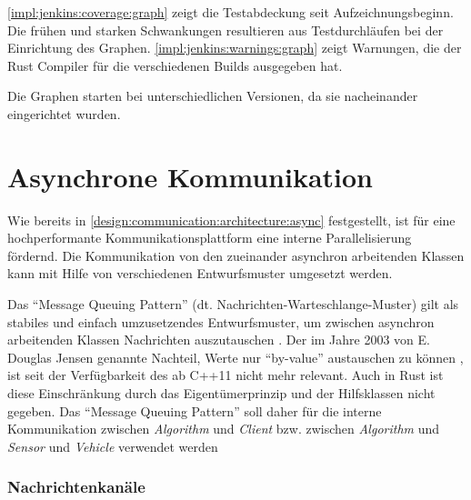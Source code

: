 \autoref{impl:jenkins:coverage:graph} zeigt die Testabdeckung seit Aufzeichnungsbeginn.
Die frühen und starken Schwankungen resultieren aus Testdurchläufen bei der Einrichtung des Graphen.
\autoref{impl:jenkins:warnings:graph} zeigt Warnungen, die der Rust Compiler für die verschiedenen Builds ausgegeben hat.

Die Graphen starten bei unterschiedlichen Versionen, da sie nacheinander eingerichtet wurden.

\clearpage
\section{Asynchrone Kommunikation}
\label{impl:channels}

Wie bereits in \autoref{design:communication:architecture:async} festgestellt, ist für eine hochperformante Kommunikationsplattform eine interne Parallelisierung fördernd.
Die Kommunikation von den zueinander asynchron arbeitenden Klassen kann mit Hilfe von verschiedenen Entwurfsmuster umgesetzt werden.

Das \enquote{Message Queuing Pattern} (dt. Nachrichten-Warteschlange-Muster) gilt als stabiles und einfach umzusetzendes Entwurfsmuster, um zwischen asynchron arbeitenden Klassen Nachrichten auszutauschen \cite[207]{douglass2003real}.
Der im Jahre 2003 von E. Douglas Jensen genannte Nachteil, Werte nur \enquote{by-value} austauschen zu können \cite[211]{douglass2003real}, ist seit der Verfügbarkeit des  ab C++11 nicht mehr relevant.
Auch in Rust ist diese Einschränkung durch das Eigentümerprinzip und der Hilfsklassen   nicht gegeben.
Das \enquote{Message Queuing Pattern} soll daher für die interne Kommunikation zwischen \textit{Algorithm} und \textit{Client} bzw. zwischen \textit{Algorithm} und \textit{Sensor} und \textit{Vehicle} verwendet werden

\subsubsection{Nachrichtenkanäle}

